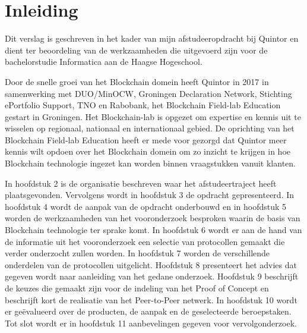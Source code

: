 \chapter{Inleiding}

Dit verslag is geschreven in het kader van mijn afstudeeropdracht bij Quintor en dient ter beoordeling van de werkzaamheden die uitgevoerd zijn voor de bachelorstudie Informatica aan de Haagse Hogeschool. 

Door de snelle groei van het Blockchain domein heeft Quintor in 2017 in samenwerking met DUO/MinOCW, Groningen Declaration Network, Stichting ePortfolio Support, TNO en Rabobank, het Blockchain Field-lab Education gestart in Groningen. Het Blockchain-lab is opgezet om expertise en kennis uit te wisselen op regionaal, nationaal en internationaal gebied. De oprichting van het Blockchain Field-lab Education heeft er mede voor gezorgd dat Quintor meer kennis wilt opdoen over het Blockchain domein om zo inzicht te krijgen in hoe Blockchain technologie ingezet kan worden binnen vraagstukken vanuit klanten. 

In hoofdstuk 2 is de organisatie beschreven waar het afstudeertraject heeft plaatsgevonden. Vervolgens wordt in hoofdstuk 3 de opdracht gepresenteerd. In hoofdstuk 4 wordt de aanpak van de opdracht onderbouwd en in hoofdstuk 5 worden de werkzaamheden van het vooronderzoek besproken waarin de basis van Blockchain technologie ter sprake komt. In hoofdstuk 6 wordt er aan de hand van de informatie uit het vooronderzoek een selectie van protocollen gemaakt die verder onderzocht zullen worden. In hoofdstuk 7 worden de verschillende onderdelen van de protocollen uitgelicht. Hoofdstuk 8 presenteert het advies dat gegeven wordt naar aanleiding van het gedane onderzoek. Hoofdstuk 9 beschrijft de keuzes die gemaakt zijn voor de indeling van het Proof of Concept en beschrijft kort de realisatie van het Peer-to-Peer netwerk. In hoofdstuk 10 wordt er geëvalueerd over de producten, de aanpak en de geselecteerde beroepstaken. Tot slot wordt er in hoofdstuk 11 aanbevelingen gegeven voor vervolgonderzoek.
